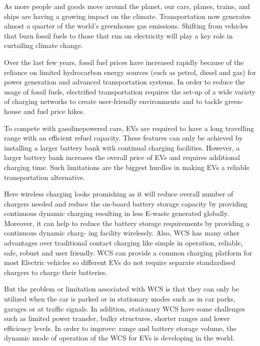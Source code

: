 As more people and goods move around the planet, our cars, planes, trains, and
ships are having a growing impact on the climate. Transportation now generates
almost a quarter of the world's greenhouse gas emissions. Shifting from vehicles
that burn fossil fuels to those that run on electricity will play a key role in curtailing
climate change. 

Over the last few years, fossil fuel prices have increased rapidly because of the reliance
on limited hydrocarbon energy sources (such as petrol, diesel and gas) for power
generation and advanced transportation systems. In order to reduce the usage of fossil
fuels, electrified transportation requires the set-up of a wide variety of charging networks
to create user-friendly environments and to tackle green-house and fuel price hikes.

To compete with gasolinepowered cars, EVs are required to have a long travelling range with an efficient refuel
capacity. These features can only be achieved by installing a larger battery bank with
continual charging facilities. However, a larger battery bank increases the overall price
of EVs and requires additional charging time. Such limitations are the biggest hurdles in
making EVs a reliable transportation alternative. 

Here wireless charging looks promishing as it will reduce overall number of chargers
needed and reduce the on-board battery storage capacity by providing continuous
dynamic charging resulting in less E-waste generated globally. Moreover, it can help to
reduce the battery storage requirements by providing a continuous dynamic charg-
ing facility wirelessly. Also, WCS has many other advantages over traditional contact 
charging like simple in operation, reliable, safe, robust and user friendly. WCS can provide
a common charging platform for most Electric vehicles so different EVs do not require separate standardised 
chargers to charge their batteries.

But the problem or limitation associated with WCS is that they can only be utilized when the
car is parked or in stationary modes such as in car parks, garages or at traffic signals.
In addition, stationary WCS have some challenges such as limited power transfer, bulky 
structures, shorter ranges and lower efficiency levels. In order to improve: range and battery storage volume, the
dynamic mode of operation of the WCS for EVs is developing in the world.




